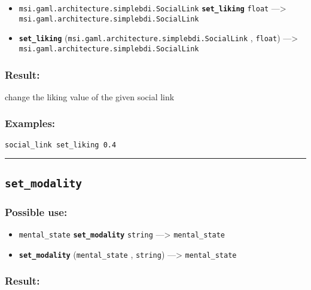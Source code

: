 \documentclass[]{book}
\providecommand{\tightlist}{%
  \setlength{\itemsep}{0pt}\setlength{\parskip}{0pt}}
\theoremstyle{definition}
\theoremstyle{definition}
\theoremstyle{definition}
\theoremstyle{remark}
\begin{document}
\begin{itemize}
\tightlist
\item
  \texttt{msi.gaml.architecture.simplebdi.SocialLink}
  \textbf{\texttt{set\_liking}} \texttt{float} ---\textgreater{}
  \texttt{msi.gaml.architecture.simplebdi.SocialLink}
\item
  \textbf{\texttt{set\_liking}}
  (\texttt{msi.gaml.architecture.simplebdi.SocialLink} , \texttt{float})
  ---\textgreater{} \texttt{msi.gaml.architecture.simplebdi.SocialLink}
\end{itemize}

\subsubsection{Result:}\label{result-446}

change the liking value of the given social link

\subsubsection{Examples:}\label{examples-319}

\begin{verbatim}
social_link set_liking 0.4 
\end{verbatim}

\begin{center}\rule{0.5\linewidth}{\linethickness}\end{center}

\subsection{\texorpdfstring{\texttt{set\_modality}}{set\_modality}}\label{set_modality}

\subsubsection{Possible use:}\label{possible-use-463}

\begin{itemize}
\tightlist
\item
  \texttt{mental\_state} \textbf{\texttt{set\_modality}} \texttt{string}
  ---\textgreater{} \texttt{mental\_state}
\item
  \textbf{\texttt{set\_modality}} (\texttt{mental\_state} ,
  \texttt{string}) ---\textgreater{} \texttt{mental\_state}
\end{itemize}

\subsubsection{Result:}\label{result-447}
\end{document}
